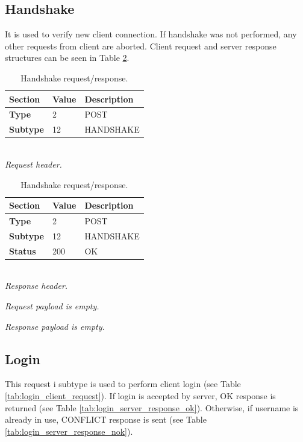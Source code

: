 \documentclass[english, sem, kiv, he, iso690alph, pdf, viewonly]{fasthesis}
\begin{document}
\subsection{Handshake}
It is used to verify new client connection. If handshake was not performed, any other requests from client are aborted. Client request and server response structures can be seen in Table \ref{tab:handshake_request_response}.

\begin{table}[h]
	\centering
	\begin{minipage}[b]{0.45\textwidth}
		\centering
		\begin{tabular}{|l|l|l|}
			\hline
			\textbf{Section} & \textbf{Value} & \textbf{Description} \\ \hline
			\textbf{Type} & 2 & \footnotesize{POST} \\ \hline
			\textbf{Subtype} & 12 & \footnotesize{HANDSHAKE} \\ \hline
		\end{tabular} \\
		\textit{Request header.}
	\end{minipage} 
	\hfill
	\begin{minipage}[b]{0.45\textwidth}
		\centering
		\begin{tabular}{|l|l|l|}
			\hline
			\textbf{Section} & \textbf{Value} & \textbf{Description} \\ \hline
				\textbf{Type} & 2 & \footnotesize{POST} \\ \hline
			\textbf{Subtype} & 12 & \footnotesize{HANDSHAKE} \\ \hline
			\textbf{Status} & 200 & \footnotesize{OK} \\ \hline
		\end{tabular} \\
		\textit{Response header.}
	\end{minipage} \newline

	\begin{minipage}[b]{0.45\textwidth}
		\centering
		\textit{Request payload is empty.}
	\end{minipage}	
	\hfill
	\begin{minipage}[b]{0.45\textwidth}
		\centering
		\textit{Response payload is empty.}
	\end{minipage}	
	\caption{Handshake request/response.}
	\label{tab:handshake_request_response}
\end{table}

\newpage
\subsection{Login}
This request i subtype is used to perform client login (see Table \ref{tab:login_client_request}). If login is accepted by server, OK response is returned (see Table \ref{tab:login_server_response_ok}). Otherwise, if username is already in use, CONFLICT response is sent (see Table \ref{tab:login_server_response_nok}). 
\end{document}
